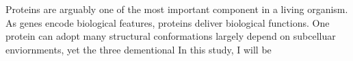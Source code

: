 Proteins are arguably one of the most important component in a living organism. As genes encode biological features, proteins deliver biological functions. One protein can adopt many structural conformations largely depend on subcelluar enviornments, yet the three dementional      In this study, I will be 